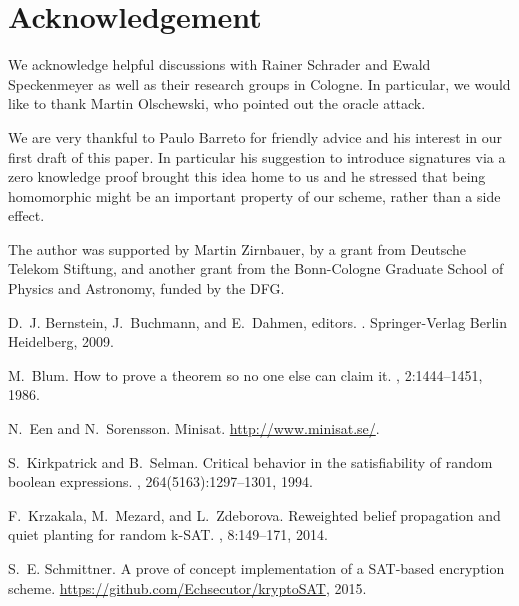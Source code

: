 \documentclass[final,journal,compsoc]{IEEEtran}
\begin{document}
\section*{Acknowledgement}
We acknowledge helpful discussions with Rainer Schrader and
Ewald Speckenmeyer as well as their research groups in Cologne. In
particular, we would like to thank Martin Olschewski, who pointed out
the oracle attack.  

We are very thankful to Paulo Barreto for friendly advice and his
interest in our first draft of this paper. In particular his
suggestion to introduce signatures via a zero knowledge proof brought
this idea home to us and he stressed that being homomorphic might be an
important property of our scheme, rather than a side effect.




The author was supported by Martin Zirnbauer, by a grant
from Deutsche Telekom Stiftung, and another grant from the
Bonn-Cologne Graduate School of Physics and Astronomy, funded by the
DFG.

\begin{thebibliography}{1}

D.~J. Bernstein, J.~Buchmann, and E.~Dahmen, editors.
.
\newblock Springer-Verlag Berlin Heidelberg, 2009.

M.~Blum.
\newblock How to prove a theorem so no one else can claim it.
, 2:1444--1451, 1986.

N.~Een and N.~Sorensson.
\newblock Minisat.
\newblock \url{http://www.minisat.se/}.

S.~Kirkpatrick and B.~Selman.
\newblock Critical behavior in the satisfiability of random boolean
  expressions.
, 264(5163):1297--1301, 1994.

F.~Krzakala, M.~Mezard, and L.~Zdeborova.
\newblock Reweighted belief propagation and quiet planting for random k-{SAT}.
,
  8:149--171, 2014.

S.~E. Schmittner.
\newblock A prove of concept implementation of a {SAT}-based encryption scheme.
\newblock \url{https://github.com/Echsecutor/kryptoSAT}, 2015.

\end{thebibliography}
\end{document}
